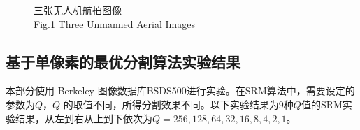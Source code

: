 \begin{figure}[H]
\centering
    \captionsetup{justification=centering}
    \caption{三张无人机航拍图像 \\ Fig.\ref{三张无人机航拍图像} Three Unmanned Aerial Images}\label{三张无人机航拍图像}
\end{figure}





\subsection{基于单像素的最优分割算法实验结果}
本部分使用 Berkeley 图像数据库BSDS500进行实验。在SRM算法中，需要设定的参数为$Q$，$Q$ 的取值不同，所得分割效果不同。以下实验结果为$9$种$Q$值的SRM实验结果，从左到右从上到下依次为$Q={ 256,128,64,32,16,8,4,2,1}$。


